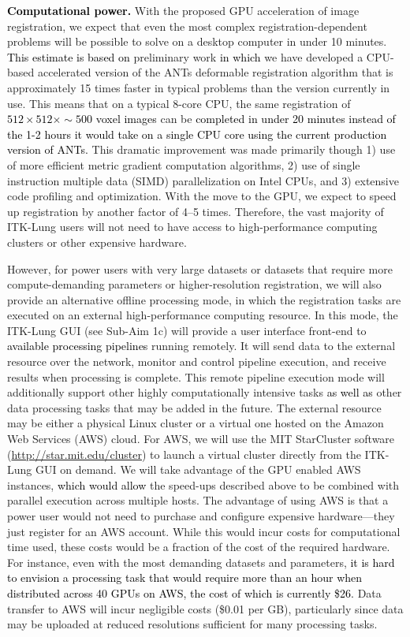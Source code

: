 \documentclass[11pt,]{article}
\begin{document}
\textbf{\textcolor{black}{Computational power.}} With the proposed GPU
acceleration of image registration, we expect that even the most complex
registration-dependent problems will be possible to solve on a desktop
computer in under 10 minutes.
\textcolor{black}{This estimate is based on} preliminary work
\textcolor{black}{in which} we have developed a CPU-based accelerated
version of the ANTs deformable registration algorithm that is
approximately 15 times faster in typical problems than the version
currently in use. This means that on a typical 8-core CPU, the same
registration of
\textcolor{black}{$512 \times 512 \times {\sim}500$ voxel images} can be
\textcolor{black}{completed in under 20 minutes
instead of the 1-2 hours it would take on a single CPU core using the current production version of ANTs.}
This dramatic improvement was made primarily though 1) use of more
efficient metric gradient computation algorithms, 2) use of single
instruction multiple data (SIMD) parallelization on Intel CPUs, and 3)
extensive code profiling and optimization. With the move to the GPU, we
expect to speed up registration by another factor of 4--5 times.
Therefore, the vast majority of ITK-Lung users will not need to have
access to high-performance computing clusters or other expensive
hardware.

However, for power users with very large datasets or datasets that
require more compute-demanding parameters or higher-resolution
registration, we will also provide an alternative offline processing
mode, in which the registration tasks are executed on an external
high-performance computing resource. In this mode, the ITK-Lung GUI (see
Sub-Aim 1c) will provide a user interface front-end to
\textcolor{black}{available processing pipelines} running remotely. It
will send data to the external resource over the network, monitor and
control pipeline execution, and receive results when processing is
complete. This remote pipeline execution mode will additionally support
other highly computationally intensive tasks
\textcolor{black}{as well as} other data processing tasks that may be
added in the future. The external resource may be either a physical
Linux cluster or a virtual one hosted on the Amazon Web Services (AWS)
cloud. For AWS, we will use the MIT StarCluster software
(\url{http://star.mit.edu/cluster}) to launch a virtual cluster directly
from the ITK-Lung GUI on demand. We will take advantage of the GPU
enabled AWS instances, \textcolor{black}{which would allow} the
speed-ups described above to be combined with parallel execution across
multiple hosts. The advantage of using AWS is that a power user would
not need to purchase and configure expensive hardware---they just
register for an AWS account. While this would incur costs for
computational time used, these costs would be a fraction of the cost of
the required hardware. For instance, even with the most demanding
datasets and parameters,
\textcolor{black}{it is hard to envision a processing task that would require
more than an hour when distributed across 40 GPUs on AWS, the cost of which is currently \$26.}
Data transfer to AWS will incur negligible costs (\$0.01 per GB),
particularly since data may be uploaded at reduced resolutions
sufficient for many processing tasks.
\end{document}
